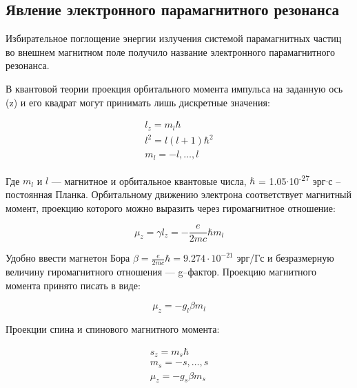 \documentclass{article}
\begin{document}
\subsection{Явление электронного парамагнитного резонанса}

Избирательное поглощение энергии излучения системой парамагнитных  частиц во внешнем магнитном поле получило название электронного парамагнитного резонанса.

В квантовой теории проекция орбитального момента импульса на заданную ось (z) и его квадрат могут принимать лишь дискретные значения:

\begin{equation}
\begin{aligned}
l_{z}=m_{l}\hbar \\
l^{2}=l(l+1)\hbar^{2} \\
m_l = -l, \dots, l
\end{aligned}
\end{equation}

Где $m_l$ и $l$ --- магнитное и орбитальное квантовые числа, $\hbar$ = 1.05$\cdot$10\textsuperscript{-27} эрг$\cdot$с – постоянная Планка. Орбитальному движению электрона соответствует магнитный момент, проекцию которого можно выразить через гиромагнитное отношение:

\begin{equation}
\mu _{z}= \gamma l_{z}=-\frac{e}{2mc}\hbar m_{l}
\end{equation}

Удобно ввести магнетон Бора $\beta =\frac{e}{2mc}\hbar = 9.274\cdot10^{-21}$ эрг/Гс и безразмерную величину гиромагнитного отношения --- g--фактор. Проекцию магнитного момента принято писать в виде:

\begin{equation}
\mu _{z}=-g_{l} \beta m_{l}
\end{equation}

Проекции спина и спинового магнитного момента:

\begin{equation}
\begin{aligned}
s_{z}=m_{s}\hbar            \\
m_{s}=-s, \dots ,s          \\
\mu _{z}=-g_{s} \beta m_{s}
\end{aligned}
\end{equation}
\end{document}
